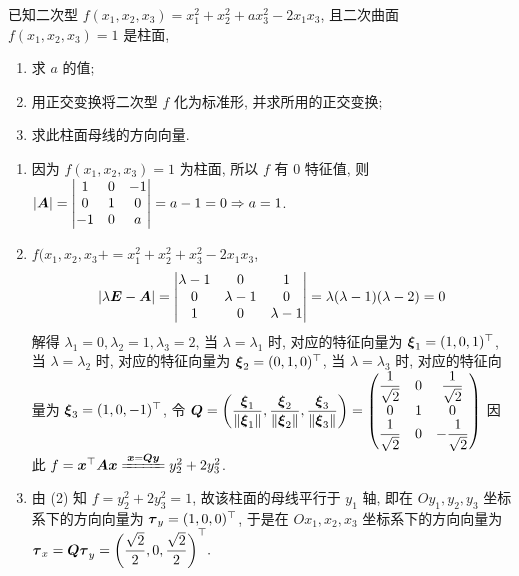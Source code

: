 \begin{example}
    已知二次型 $f(x_1, x_2, x_3)=x_1^2+x_2^2+ax_3^2-2x_1x_3$, 且二次曲面 $f(x_1, x_2, x_3)=1$ 是柱面,
    \begin{enumerate}[label=(\arabic{*})]
        \item 求 $a$ 的值;
        \item 用正交变换将二次型 $f$ 化为标准形, 并求所用的正交变换;
        \item 求此柱面母线的方向向量.
    \end{enumerate}
\end{example}
\begin{solution}
    \begin{enumerate}[label=(\arabic{*})]
        \item 因为 $f(x_1, x_2, x_3)=1$ 为柱面, 所以 $f$ 有 $0$ 特征值, 则 $|\vb*{A}|=\mqty|1&0&-1\\0&1&0\\-1&0&a|=a-1=0\Rightarrow a=1$.
        \item $f(x_1, x_2, x_3+=x_1^2+ x_2^2+ x_3^2-2x_1x_3$, $$
        |\lambda\vb*{E}-\vb*{A}|=\mqty| \lambda-1 & 0 & 1 \\ 0 & \lambda-1 & 0 \\ 1 & 0 & \lambda-1 \\|=\lambda(\lambda-1)(\lambda-2)=0
        $$
        解得 $\lambda_1=0, \lambda_2=1, \lambda_3=2$, 当 $\lambda=\lambda_1$ 时, 对应的特征向量为 $\vb*{\xi}_1=(1,0,1)^\top$, 当 $\lambda=\lambda_2$ 时, 对应的特征向量为 $\vb*{\xi}_2=(0,1,0)^\top$, 当 $\lambda=\lambda_3$ 时, 对应的特征向量为 $\vb*{\xi}_3=(1,0,-1)^\top$, 
        令 $\vb*{Q}=\qty(\dfrac{\vb*{\xi}_1}{\left\lVert \vb*{\xi}_1\right\rVert },\dfrac{\vb*{\xi}_2}{\left\lVert \vb*{\xi}_2\right\rVert },\dfrac{\vb*{\xi}_3}{\left\lVert \vb*{\xi}_3\right\rVert })=\begin{pmatrix} \dfrac{1}{\sqrt{2}} & 0 & \dfrac{1}{\sqrt{2}} \\ 0 & 1 & 0 \\ \dfrac{1}{\sqrt{2}} & 0 & -\dfrac{1}{\sqrt{2}} \\\end{pmatrix}$
        因此 $f=\vb*{x}^\top\vb*{Ax}\xlongequal{\vb*{x}=\vb*{Qy}}y_2^2+2y_3^2$.
        \item 由 (2) 知 $f=y_2^2+2y_3^2=1$, 故该柱面的母线平行于 $y_1$ 轴, 即在 $Oy_1, y_2, y_3$ 坐标系下的方向向量为 $\vb*{\tau }_y=(1,0,0)^\top$, 于是在 $Ox_1, x_2, x_3$ 坐标系下的方向向量为 $\vb*{\tau}_x=\vb*{Q\tau}_y=\qty(\dfrac{\sqrt{2}}{2},0,\dfrac{\sqrt{2}}{2})^\top.$
    \end{enumerate}
\end{solution}

